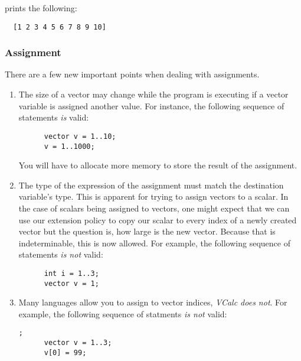 \documentclass{article}
\begin{document}
prints the following:
\begin{lstlisting}
  [1 2 3 4 5 6 7 8 9 10]
\end{lstlisting}

\subsubsection{Assignment}
There are a few new important points when dealing with assignments.
\begin{enumerate}
  \item
    The size of a vector may change while the program is executing if a vector variable is assigned
    another value. For instance, the following sequence of statements \textit{is} valid:
    \begin{lstlisting}
      vector v = 1..10;
      v = 1..1000;
    \end{lstlisting}
    You will have to allocate more memory to store the result of the assignment.
  \item
    The type of the expression of the assignment must match the destination variable's type. This
    is apparent for trying to assign vectors to a scalar. In the case of scalars being assigned to
    vectors, one might expect that we can use our extension policy to copy our scalar to every index
    of a newly created vector but the question is, how large is the new vector. Because that is
    indeterminable, this is now allowed. For example, the following sequence of statements
    \textit{is not} valid:
    \begin{lstlisting}
      int i = 1..3;
      vector v = 1;
    \end{lstlisting}
  \item
    Many languages allow you to assign to vector indices, \textit{VCalc does not}. For example, the
    following sequence of statments \textit{is not} valid:
    \begin{lstlisting};
      vector v = 1..3;
      v[0] = 99;
    \end{lstlisting}
\end{enumerate}
\end{document}
